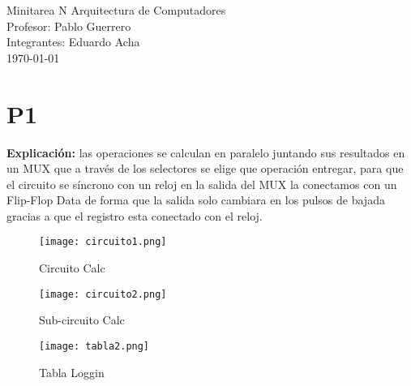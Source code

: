 \documentclass[10pt,letterpaper]{article}
\begin{document}
\begin{center}
\Huge{Minitarea N Arquitectura de Computadores\\}
\vspace*{1cm}
\large{Profesor: Pablo Guerrero\\}
\large{Integrantes: Eduardo Acha\\}
\large{\today}
\end{center}
\section*{P1}
\par \textbf{Explicación:} las operaciones se calculan en paralelo juntando sus resultados en un MUX que a través de los selectores se elige que operación entregar, para que el circuito se síncrono con un reloj en la salida del MUX la conectamos con un Flip-Flop Data de forma que la salida solo cambiara en los pulsos de bajada gracias a que el registro esta conectado con el reloj.
\\
\begin{figure}[h]
\texttt{[image: circuito1.png]}
\centering
\caption{Circuito Calc}
\end{figure}

\begin{figure}[h]
\texttt{[image: circuito2.png]}
\centering
\caption{Sub-circuito Calc}
\end{figure}

\begin{figure}[h]
\texttt{[image: tabla2.png]}
\caption{Tabla Loggin}
\end{figure}
\end{document}
